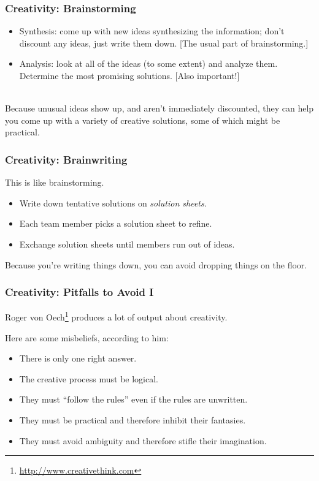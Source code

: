 \begin{frame}
\frametitle{Creativity: Brainstorming}

\begin{changemargin}{2cm}
\begin{itemize}
\item Synthesis: come up with new ideas synthesizing the information;
  don't discount any ideas, just write them down. [The usual part of
    brainstorming.]\\[1em]
\item Analysis: look at all of the ideas (to some extent) and analyze them. Determine the most promising solutions. [Also important!]
\end{itemize}
~\\

Because unusual ideas show up, and aren't immediately discounted, 
they can help you come up with a variety of creative solutions, some of 
which might be practical.
\end{changemargin}
\end{frame}

\begin{frame}
\frametitle{Creativity: Brainwriting}

\begin{changemargin}{2cm}
This is like brainstorming.

\begin{itemize}
\item Write down tentative solutions on \emph{solution sheets}.
\item Each team member picks a solution sheet to refine.
\item Exchange solution sheets until members run out of ideas.
\end{itemize}
Because you're writing things down, you can avoid dropping things on the floor.
\end{changemargin}

\end{frame}

\begin{frame}
\frametitle{Creativity: Pitfalls to Avoid I}

\begin{changemargin}{1cm}
Roger von 
Oech\footnote{\url{http://www.creativethink.com}} produces a lot of
output about creativity. 

Here are some misbeliefs, according to him:
\begin{itemize}
\item There is only one right answer.
\item The creative process must be logical.
\item They must ``follow the rules'' even if the rules are unwritten.
\item They must be practical and therefore inhibit their fantasies.
\item They must avoid ambiguity and therefore stifle their imagination.
\end{itemize}
\end{changemargin}

\end{frame}

